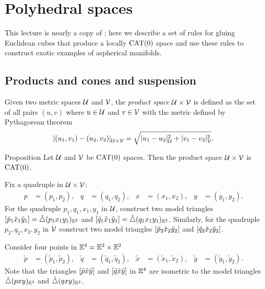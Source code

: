 \chapter{Polyhedral spaces}\label{chap:poly}

This lecture is nearly a copy of \cite[Sections 3.4--3.8]{alexander-kapovitch-petrunin-2019};
here we describe a set of rules for gluing Euclidean cubes that produce a 
locally $\mathrm{CAT}(0)$ space and use these rules to construct exotic examples of aspherical manifolds.

\section{Products and cones and suspension}
\label{sec:Products and cones}

Given two metric spaces $\mathcal{U}$ and $\mathcal{V}$, the \emph{product space} 
$\mathcal{U}\times\mathcal{V}$ is defined as the set of all pairs $(u,v)$ where $u\in\mathcal{U}$ and $v\in \mathcal{V}$ 
with the metric defined by Pythagorean theorem
\[\dist{(u_1,v_1)}{(u_2,v_2)}{\spc{U}\times\spc{V}}=\sqrt{\dist[2]{u_1}{u_2}{\spc{U}}+\dist[2]{v_1}{v_2}{\spc{V}}}.\]

\begin{thm}{Proposition}\label{ex:product-CAT}
Let $\mathcal{U}$ and $\mathcal{V}$ be $\mathrm{CAT}(0)$ spaces.
Then the product space $\mathcal{U}\times\mathcal{V}$ is $\mathrm{CAT}(0)$.
\end{thm}

Fix a quadruple in $\mathcal{U}\times \mathcal{V}$:
\begin{align*}
p&=(p_1,p_2),
&
q&=(q_1,q_2), 
&
x&=(x_1,x_2),
&
y&=(y_1,y_2).
\end{align*}
For the quadruple $p_1,q_1,x_1,y_1$ in $\mathcal{U}$,
construct two model triangles $[\tilde p_1\tilde x_1\tilde y_1]=\tilde\triangle(p_1x_1y_1)_{\mathbb{E}^2}$ 
and $[\tilde q_1\tilde x_1\tilde y_1]=\tilde\triangle(q_1x_1y_1)_{\mathbb{E}^2}$.  
Similarly, for the quadruple $p_2,q_2,x_2,y_2$ in $\mathcal{V}$
construct two model triangles $[\tilde p_2\tilde x_2\tilde y_2]$ and $[\tilde q_2\tilde x_2\tilde y_2]$.

Consider four points in $\mathbb{E}^4=\mathbb{E}^2\times\mathbb{E}^2$ 
\begin{align*}
\tilde p&=(\tilde p_1,\tilde p_2),
&
\tilde q&=(\tilde q_1,\tilde q_2),
&
\tilde x&=(\tilde x_1,\tilde x_2),
&
\tilde y&=(\tilde y_1,\tilde y_2).
\end{align*}
Note that the triangles $[\tilde p\tilde x\tilde y]$ and $[\tilde q\tilde x\tilde y]$ in $\mathbb{E}^4$ are isometric to the model triangles 
$\tilde\triangle(pxy)_{\mathbb{E}^2}$ and $\tilde\triangle(qxy)_{\mathbb{E}^2}$.

